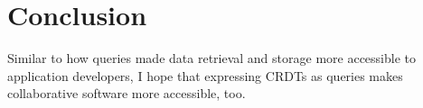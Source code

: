 
\chapter{Conclusion}\label{ch:conclusion}

Similar to how queries made data retrieval and storage more accessible to
application developers, I hope that expressing \acp{CRDT} as queries
makes collaborative software more accessible, too.
